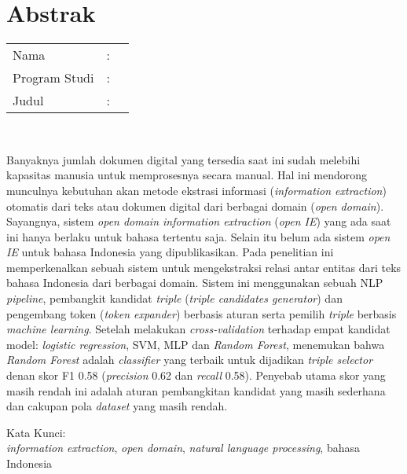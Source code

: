 %
%
%

\chapter*{Abstrak}

\vspace*{0.2cm}

\noindent \begin{tabular}{l l p{10cm}}
	Nama&: & \penulis \\
	Program Studi&: & \program \\
	Judul&: & \judul \\
\end{tabular} \\ 

\vspace*{0.5cm}

\noindent Banyaknya jumlah dokumen digital yang tersedia saat ini sudah melebihi kapasitas manusia untuk memprosesnya secara manual. Hal ini mendorong munculnya kebutuhan akan metode ekstrasi informasi (\textit{information extraction}) otomatis dari teks atau dokumen digital dari berbagai domain (\textit{open domain}). Sayangnya, sistem \textit{open domain information extraction} (\textit{open IE}) yang ada saat ini hanya berlaku untuk bahasa tertentu saja. Selain itu belum ada sistem \textit{open IE} untuk bahasa Indonesia yang dipublikasikan. Pada penelitian ini \saya memperkenalkan sebuah sistem untuk mengekstraksi relasi antar entitas dari teks bahasa Indonesia dari berbagai domain. Sistem ini menggunakan sebuah NLP \textit{pipeline}, pembangkit kandidat \textit{triple} (\textit{triple candidates generator}) dan pengembang token (\textit{token expander}) berbasis aturan serta pemilih \textit{triple} berbasis \textit{machine learning}. Setelah melakukan \textit{cross-validation} terhadap empat kandidat model: \textit{logistic regression}, SVM, MLP dan \textit{Random Forest}, \saya menemukan bahwa \textit{Random Forest} adalah \textit{classifier} yang terbaik untuk dijadikan \textit{triple selector} denan skor F1 0.58 (\textit{precision} 0.62 dan \textit{recall} 0.58). Penyebab utama skor yang masih rendah ini adalah aturan pembangkitan kandidat yang masih sederhana dan cakupan pola \textit{dataset} yang masih rendah. \\

\vspace*{0.2cm}

\noindent Kata Kunci: \\ 
\noindent \textit{information extraction}, \textit{open domain}, \textit{natural language processing}, bahasa Indonesia \\

\newpage